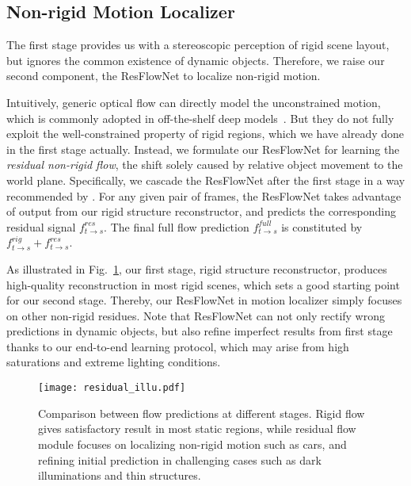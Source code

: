 \subsection{Non-rigid Motion Localizer}
\label{sec::resflow}
The first stage provides us with a stereoscopic perception of rigid scene layout, but ignores the common existence of dynamic objects. Therefore, we raise our second component, \ie the ResFlowNet to localize non-rigid motion. 

Intuitively, generic optical flow can directly model the unconstrained motion, which is commonly adopted in off-the-shelf deep models~\cite{FischerDIHHGSCB15,IMKDB17}. But they do not fully exploit the well-constrained property of rigid regions, which we have already done in the first stage actually. Instead, we formulate our ResFlowNet for learning the \textit{residual non-rigid flow}, the shift solely caused by relative object movement to the world plane. Specifically, we cascade the ResFlowNet after the first stage in a way recommended by \cite{IMKDB17}. For any given pair of frames, the ResFlowNet takes advantage of output from our rigid structure reconstructor, and predicts the corresponding residual signal $f^{res}_{t\to s}$. The final full flow prediction $f^{full}_{t\to s}$ is constituted by $f^{rig}_{t\to s}+f^{res}_{t\to s}$. 

As illustrated in Fig.~\ref{fig::residual}, our first stage, rigid structure reconstructor, produces high-quality reconstruction in most rigid scenes, which sets a good starting point for our second stage. Thereby, our ResFlowNet in motion localizer simply focuses on other non-rigid residues. Note that ResFlowNet can not only rectify wrong predictions in dynamic objects, but also refine imperfect results from first stage thanks to our end-to-end learning protocol, which may arise from high saturations and extreme lighting conditions. 


\begin{figure}[t]
\begin{center}
   \texttt{[image: residual\_illu.pdf]}
\end{center}
\vspace{-1ex}
   \caption{Comparison between flow predictions at different stages. Rigid flow gives satisfactory result in most static regions, while residual flow module focuses on localizing non-rigid motion such as cars, and refining initial prediction in challenging cases such as dark illuminations and thin structures.}\vspace{-2ex}
\label{fig::residual}
\end{figure}

